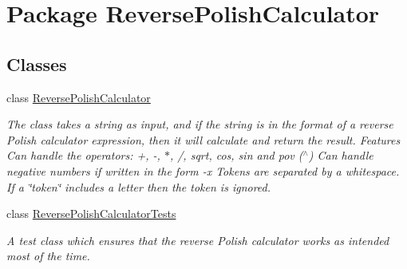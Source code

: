 \hypertarget{namespace_reverse_polish_calculator}{\section{Package Reverse\+Polish\+Calculator}
\label{namespace_reverse_polish_calculator}
}
\subsection*{Classes}
\begin{DoxyCompactItemize}
\item 
class \hyperlink{class_reverse_polish_calculator_1_1_reverse_polish_calculator}{Reverse\+Polish\+Calculator}
\begin{DoxyCompactList}\small\item\em The class takes a string as input, and if the string is in the format of a reverse Polish calculator expression, then it will calculate and return the result. Features Can handle the operators\+: +, -\/, $\ast$, /, sqrt, cos, sin and pov ($^\wedge$) Can handle negative numbers if written in the form -\/x Tokens are separated by a whitespace. If a \char`\"{}token\char`\"{} includes a letter then the token is ignored. \end{DoxyCompactList}\item 
class \hyperlink{class_reverse_polish_calculator_1_1_reverse_polish_calculator_tests}{Reverse\+Polish\+Calculator\+Tests}
\begin{DoxyCompactList}\small\item\em A test class which ensures that the reverse Polish calculator works as intended most of the time. \end{DoxyCompactList}\end{DoxyCompactItemize}
